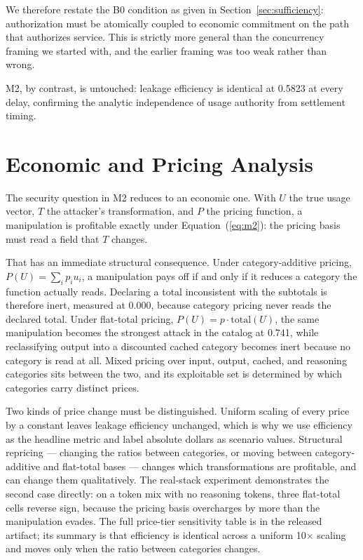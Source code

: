 \documentclass[preprint,3p,authoryear,12pt]{elsarticle}
\begin{document}
We therefore restate the B0 condition as given in Section~\ref{sec:sufficiency}:
authorization must be atomically coupled to economic commitment on the path that
authorizes service. This is strictly more general than the concurrency framing we started
with, and the earlier framing was too weak rather than wrong.

M2, by contrast, is untouched: leakage efficiency is identical at 0.5823 at every delay,
confirming the analytic independence of usage authority from settlement timing.

\section{Economic and Pricing Analysis}
\label{sec:economics}
The security question in M2 reduces to an economic one. With $U$ the true usage vector,
$T$ the attacker's transformation, and $P$ the pricing function, a manipulation is
profitable exactly under Equation~(\ref{eq:m2}): the pricing basis must read a field that
$T$ changes.

That has an immediate structural consequence. Under category-additive pricing, $P(U) =
\sum_i p_i u_i$, a manipulation pays off if and only if it reduces a category the
function actually reads. Declaring a total inconsistent with the subtotals is therefore
inert, measured at 0.000, because category pricing never reads the declared total. Under
flat-total pricing, $P(U) = p \cdot \mathrm{total}(U)$, the same manipulation becomes the
strongest attack in the catalog at 0.741, while reclassifying output into a discounted
cached category becomes inert because no category is read at all. Mixed pricing over
input, output, cached, and reasoning categories sits between the two, and its exploitable
set is determined by which categories carry distinct prices.

Two kinds of price change must be distinguished. Uniform scaling of every price by a
constant leaves leakage efficiency unchanged, which is why we use efficiency as the
headline metric and label absolute dollars as scenario values. Structural repricing ---
changing the ratios between categories, or moving between category-additive and
flat-total bases --- changes which transformations are profitable, and can change them
qualitatively. The real-stack experiment demonstrates the second case directly: on a
token mix with no reasoning tokens, three flat-total cells reverse sign, because the
pricing basis overcharges by more than the manipulation evades. The full price-tier
sensitivity table is in the released artifact; its summary is that efficiency is
identical across a uniform 10$\times$ scaling and moves only when the ratio between
categories changes.
\end{document}
